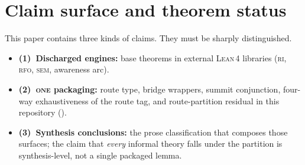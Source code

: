 \documentclass[11pt]{article}
\theoremstyle{plain}
\theoremstyle{definition}
\theoremstyle{remark}
\newcommand{\ONE}{\textsc{one}}
\newcommand{\RI}{\textsc{ri}}
\newcommand{\RFO}{\textsc{rfo}}
\newcommand{\SEM}{\textsc{sem}}
\newcommand{\Lean}{\textsc{Lean\,4}}
\begin{document}
\section{Claim surface and theorem status}
\label{sec:status}

This paper contains three kinds of claims.  They must be sharply
distinguished.

\begin{keybox}[title={Three layers readers must not conflate}]
\begin{itemize}[leftmargin=1.3em,itemsep=0.45em,parsep=0pt,topsep=2pt]
\item \textbf{(1)~Discharged engines:} base theorems in external \Lean{}
      libraries (\RI, \RFO, \SEM, awareness arc).
\item \textbf{(2)~\ONE{} packaging:} route type, bridge wrappers, summit conjunction,
      four-way exhaustiveness of the route tag, and route-partition residual
      in this repository ().
\item \textbf{(3)~Synthesis conclusions:} the prose classification that composes those surfaces;
      the claim that \emph{every} informal theory falls under the partition is
      synthesis-level, not a single packaged lemma.
\end{itemize}
\end{keybox}
\end{document}
